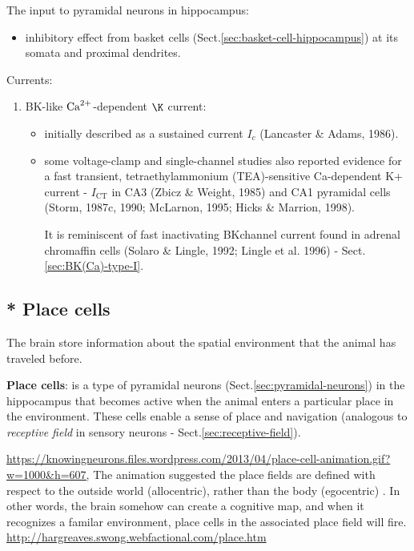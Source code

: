 The input to pyramidal neurons in hippocampus:
\begin{itemize}
  \item inhibitory effect from basket cells (Sect.\ref{sec:basket-cell-hippocampus})
  at its somata and proximal dendrites.
  
\end{itemize}

Currents:
\begin{enumerate}
  \item BK-like ${\text{Ca}^{2+}}$-dependent $\K$ current:
  \begin{itemize}
    \item initially described as a sustained current $I_c$ (Lancaster \& Adams,
    1986).

    \item some voltage-clamp and single-channel studies also reported evidence
    for a fast transient, tetraethylammonium (TEA)-sensitive Ca-dependent K+
    current - $I_\text{CT}$ in CA3 (Zbicz \& Weight, 1985) and
    CA1 pyramidal cells (Storm, 1987c, 1990; McLarnon, 1995; Hicks \& Marrion,
    1998). 
    
    It is reminiscent of fast inactivating BKchannel current found in adrenal
    chromaffin cells (Solaro \& Lingle, 1992; Lingle et al. 1996) -
    Sect.\ref{sec:BK(Ca)-type-I}.
    
  \end{itemize}
  
  
\end{enumerate}
    
\subsection{ * Place cells}
\label{sec:place_cells}

The brain store information about the spatial environment that the animal has
traveled before.

{\bf Place cells}: is a type of pyramidal neurons
(Sect.\ref{sec:pyramidal-neurons}) in the hippocampus that becomes active when
the animal enters a particular place in the environment. These cells enable a
sense of place and navigation (analogous to {\it receptive field} in sensory
neurons - Sect.\ref{sec:receptive-field}).

\url{https://knowingneurons.files.wordpress.com/2013/04/place-cell-animation.gif?w=1000&h=607,}
The animation suggested the place fields are defined with respect to the outside
world (allocentric), rather than the body (egocentric) \citep{moser2004}.
In other words, the brain somehow can create a cognitive map, and when it
recognizes a familar environment, place cells in the associated place field will
fire.
\url{http://hargreaves.swong.webfactional.com/place.htm}

